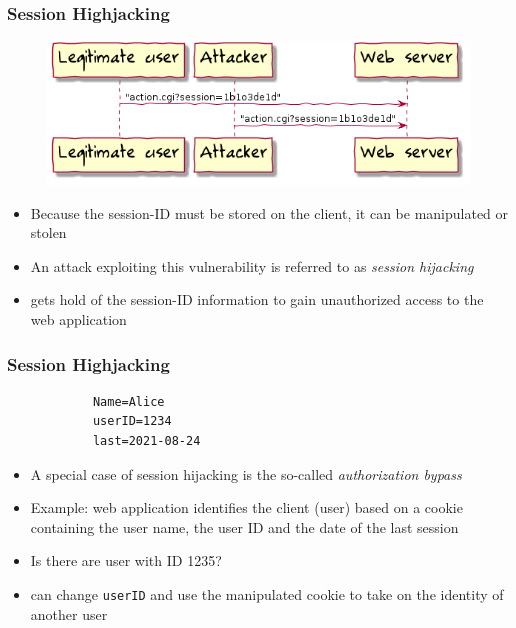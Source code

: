 \begin{frame}
    \frametitle{Session Highjacking}
    \begin{figure}[htb]
        \centering
        \includegraphics[scale=.5]{uml/session-hijacking.png}
    \end{figure}
    \begin{itemize}
        \item Because the session-ID must be stored on the client, it can be manipulated or stolen
        \item An attack exploiting this vulnerability is referred to as \emph{session hijacking}
        \item \Attacker gets hold of the session-ID information to gain unauthorized access to the web application
    \end{itemize}
\end{frame}

\begin{frame}[fragile]
    \frametitle{Session Highjacking}

    \begin{center}
        \begin{verbatim}
            Name=Alice
            userID=1234
            last=2021-08-24
        \end{verbatim}
    \end{center}

    \begin{itemize}
        \item A special case of session hijacking is the so-called \emph{authorization bypass}
        \item Example: web application identifies the client (user) based on a cookie containing the user name, the user ID and the date of the last session
        \item Is there are user with ID 1235?
        \item \Attacker can change \verb|userID| and use the manipulated cookie to take on the identity of another user
    \end{itemize}
\end{frame}

